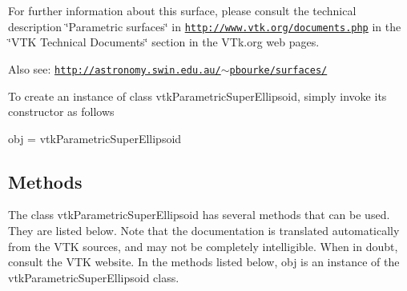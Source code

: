 For further information about this surface, please consult the technical description \char`\"{}\-Parametric surfaces\char`\"{} in \href{http://www.vtk.org/documents.php}{\tt http\-://www.\-vtk.\-org/documents.\-php} in the \char`\"{}\-V\-T\-K Technical Documents\char`\"{} section in the V\-Tk.\-org web pages.

Also see\-: \href{http://astronomy.swin.edu.au/~pbourke/surfaces/}{\tt http\-://astronomy.\-swin.\-edu.\-au/$\sim$pbourke/surfaces/}

To create an instance of class vtk\-Parametric\-Super\-Ellipsoid, simply invoke its constructor as follows \begin{DoxyVerb}  obj = vtkParametricSuperEllipsoid
\end{DoxyVerb}
 \hypertarget{vtkwidgets_vtkxyplotwidget_Methods}{}\subsection{Methods}\label{vtkwidgets_vtkxyplotwidget_Methods}
The class vtk\-Parametric\-Super\-Ellipsoid has several methods that can be used. They are listed below. Note that the documentation is translated automatically from the V\-T\-K sources, and may not be completely intelligible. When in doubt, consult the V\-T\-K website. In the methods listed below, {\ttfamily obj} is an instance of the vtk\-Parametric\-Super\-Ellipsoid class. 
